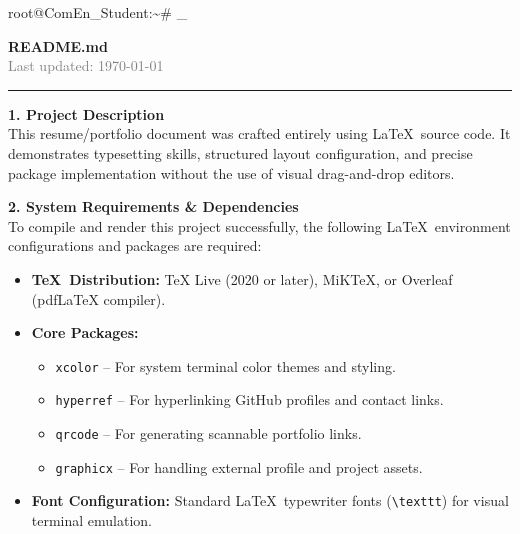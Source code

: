 \documentclass{article}
\begin{document}
\vfill
\noindent
\textcolor{CommentGreen}{root@ComEn\_Student:\textasciitilde\#} \_

\newpage
\pagecolor{white} %
\color{black}     %

\noindent
\Large\textbf{README.md} \\
\normalsize
\textcolor{gray}{Last updated: \today} \\
\rule{\textwidth}{0.4pt} %

\vspace{0.2in}

\noindent
\large\textbf{1. Project Description} \\
\normalsize
This resume/portfolio document was crafted entirely using \LaTeX\ source code. It demonstrates typesetting skills, structured layout configuration, and precise package implementation without the use of visual drag-and-drop editors.

\vspace{0.2in}

\noindent
\large\textbf{2. System Requirements \& Dependencies} \\
\normalsize
To compile and render this project successfully, the following \LaTeX\ environment configurations and packages are required:

\begin{itemize}
    \item \textbf{\TeX\ Distribution:} TeX Live (2020 or later), MiKTeX, or Overleaf (pdfLaTeX compiler).
    \item \textbf{Core Packages:}
    \begin{itemize}
        \item \texttt{xcolor} -- For system terminal color themes and styling.
        \item \texttt{hyperref} -- For hyperlinking GitHub profiles and contact links.
        \item \texttt{qrcode} -- For generating scannable portfolio links.
        \item \texttt{graphicx} -- For handling external profile and project assets.
    \end{itemize}
    \item \textbf{Font Configuration:} Standard \LaTeX\ typewriter fonts (\texttt{\textbackslash texttt}) for visual terminal emulation.
\end{itemize}
\end{document}
